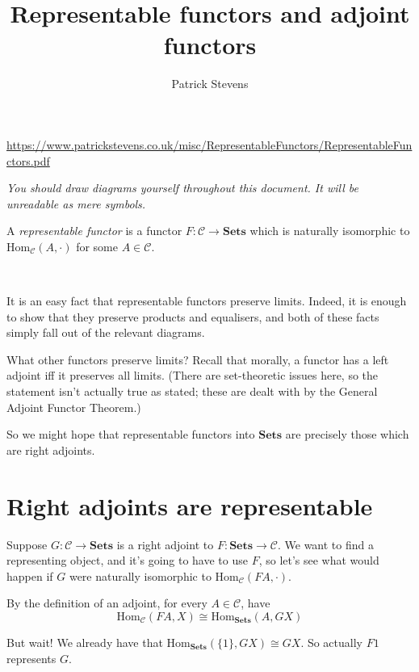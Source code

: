 \documentclass[11pt]{amsart}
\title{Representable functors and adjoint functors}
\author{Patrick Stevens}
\begin{document}
\maketitle

\tiny \begin{center} \url{https://www.patrickstevens.co.uk/misc/RepresentableFunctors/RepresentableFunctors.pdf} \end{center}

\normalsize

\emph{You should draw diagrams yourself throughout this document. It will be unreadable as mere symbols.}

\begin{defn}A \emph{representable functor} is a functor $F: \mathcal{C} \to \mathbf{Sets}$ which is naturally isomorphic to $\text{Hom}_{\mathcal{C}}(A, \cdot)$ for some $A \in \mathcal{C}$.\end{defn}

\

It is an easy fact that representable functors preserve limits.
Indeed, it is enough to show that they preserve products and equalisers, and both of these facts simply fall out of the relevant diagrams.

What other functors preserve limits?
Recall that morally, a functor has a left adjoint iff it preserves all limits.
(There are set-theoretic issues here, so the statement isn't actually true as stated; these are dealt with by the General Adjoint Functor Theorem.)

So we might hope that representable functors into $\mathbf{Sets}$ are precisely those which are right adjoints.

\section{Right adjoints are representable}

Suppose $G: \mathcal{C} \to \mathbf{Sets}$ is a right adjoint to $F: \mathbf{Sets} \to \mathcal{C}$.
We want to find a representing object, and it's going to have to use $F$, so let's see what would happen if $G$ were naturally isomorphic to $\text{Hom}_{\mathcal{C}}(FA, \cdot)$.

By the definition of an adjoint, for every $A \in \mathcal{C}$, have $$\text{Hom}_{\mathcal{C}}(FA, X) \cong \text{Hom}_{\mathbf{Sets}}(A, GX)$$

But wait! We already have that $\text{Hom}_{\mathbf{Sets}}(\{ 1 \}, GX) \cong GX$.
So actually $F1$ represents $G$.
\end{document}
